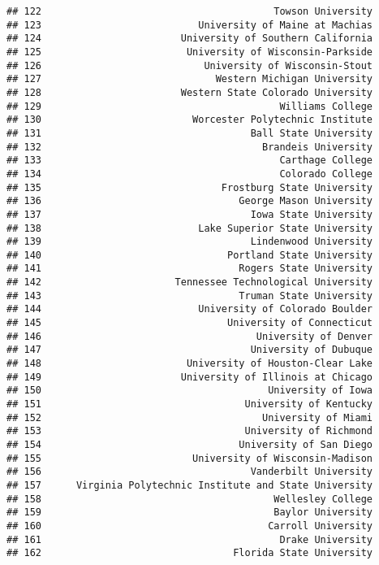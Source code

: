 \documentclass[
]{article}
\begin{document}
\begin{verbatim}
## 122                                        Towson University
## 123                           University of Maine at Machias
## 124                        University of Southern California
## 125                         University of Wisconsin-Parkside
## 126                            University of Wisconsin-Stout
## 127                              Western Michigan University
## 128                        Western State Colorado University
## 129                                         Williams College
## 130                          Worcester Polytechnic Institute
## 131                                    Ball State University
## 132                                      Brandeis University
## 133                                         Carthage College
## 134                                         Colorado College
## 135                               Frostburg State University
## 136                                  George Mason University
## 137                                    Iowa State University
## 138                           Lake Superior State University
## 139                                    Lindenwood University
## 140                                Portland State University
## 141                                  Rogers State University
## 142                       Tennessee Technological University
## 143                                  Truman State University
## 144                           University of Colorado Boulder
## 145                                University of Connecticut
## 146                                     University of Denver
## 147                                    University of Dubuque
## 148                         University of Houston-Clear Lake
## 149                        University of Illinois at Chicago
## 150                                       University of Iowa
## 151                                   University of Kentucky
## 152                                      University of Miami
## 153                                   University of Richmond
## 154                                  University of San Diego
## 155                          University of Wisconsin-Madison
## 156                                    Vanderbilt University
## 157      Virginia Polytechnic Institute and State University
## 158                                        Wellesley College
## 159                                        Baylor University
## 160                                       Carroll University
## 161                                         Drake University
## 162                                 Florida State University

\end{verbatim}
\end{document}

